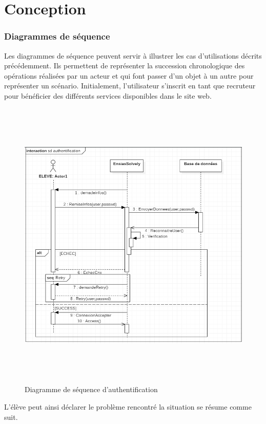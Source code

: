 \documentclass[11.5pt]{report}
\begin{document}
\section{Conception}
\subsubsection{Diagrammes de séquence}
Les diagrammes de séquence peuvent servir à illustrer les cas d’utilisations décrits précédemment. Ils permettent de représenter la succession chronologique des opérations réalisées par un acteur et qui font passer d’un objet à un autre pour représenter un scénario.
Initialement, l’utilisateur s’inscrit  en tant que recruteur pour bénéficier des différents services disponibles dans le site web.\\
\begin{figure}[h]
	
	\begin{center}
		\includegraphics[width=400pt,height=400pt]{seq1.png} 
		\caption{Diagramme de séquence d'authentification}
	\end{center}
	
\end{figure}
\newpage
L’élève peut ainsi déclarer le problème rencontré la situation se résume comme suit.\\
\end{document}
